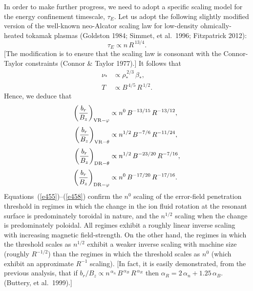\documentclass[notitlepage,12pt]{article}
\begin{document}
In order to make further progress, we need to adopt a specific scaling model for the energy confinement timescale, $\tau_E$. Let us adopt
the following slightly modified version of the well-known neo-Alcator scaling law for low-density ohmically-heated tokamak plasmas (Goldston 1984; Simmet, et al.\ 1996; Fitzpatrick 2012): 
\begin{equation}
\tau_E\propto n\,R^{\,13/4}.
\end{equation}
[The modification is to ensure that the scaling law is consonant with the Connor-Taylor constraints (Connor \& Taylor 1977).]
It follows that
\begin{align}
\nu_\ast&\propto \rho_\ast^{\,2/3}\,\beta_\ast,\\[0.5ex]
T&\propto B^{\,4/5}\,R^{\,1/2}.
\end{align}
Hence, we deduce that 
\begin{align}\label{e455}
\left(\frac{b_{r}}{B_z}\right)_{{\rm VR}-\varphi} &\propto n^{0}\,B^{-13/15}\,R^{-13/12},\\[0.5ex]
\left(\frac{b_{r}}{B_z}\right)_{{\rm VR}-\theta} &\propto n^{1/2}\,B^{-7/6}\,R^{-11/24},\\[0.5ex]
\left(\frac{b_{r}}{B_z}\right)_{{\rm DR}-\theta} &\propto n^{1/2}\,B^{-23/20}\,R^{-7/16},\\[0.5ex]
\left(\frac{b_{r}}{B_z}\right)_{{\rm DR}-\varphi} &\propto n^{0}\,B^{-17/20}\,R^{-17/16}.\label{e458}
\end{align}
Equations~(\ref{e455})--(\ref{e458}) confirm the $n^{0}$ scaling of the error-field penetration threshold in regimes in which the change in the ion fluid rotation at the resonant surface is predominately toroidal
in nature, and the $n^{1/2}$ scaling when the change is predominately poloidal. All regimes exhibit a roughly linear inverse scaling with increasing magnetic field-strength. On the other hand, the regimes in which the threshold scales as $n^{1/2}$ exhibit a
weaker inverse scaling with machine size (roughly $R^{-1/2}$) than the regimes in which the threshold scales as $n^0$ (which
exhibit an approximate $R^{-1}$ scaling). [In fact, it is easily demonstrated, from the previous analysis, that if 
$b_r/B_z\propto n^{\,\alpha_n}\,B^{\,\alpha_B}\,R^{\,\alpha_R}$ then $\alpha_R = 2\,\alpha_n+1.25\,\alpha_B$. (Buttery, et al.\ 1999).]
\end{document}
